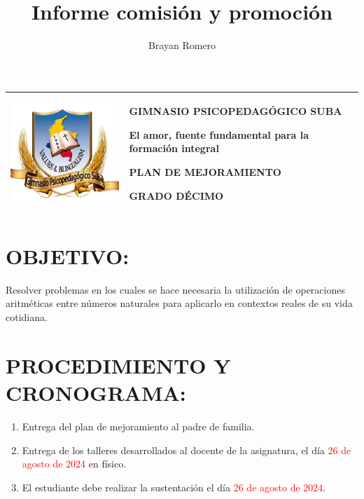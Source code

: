 \documentclass[spanish,12pt,a4paper]{article}
\title{Informe comisión y promoción}
\author{Brayan Romero}
\begin{document}
	
	\begin{center}
		\begin{tabular}{|p{3cm}|p{12cm}|}
			\hline
			\vspace{0.05cm}
			\centering
			\includegraphics[scale=0.35]{logo.png}
			&
			\begin{center}
				\textbf{GIMNASIO PSICOPEDAGÓGICO SUBA}
				
				\vspace{0.1cm}
				El amor, fuente fundamental para la formación integral
				
				\vspace{0.1cm}
				\textbf{PLAN DE MEJORAMIENTO}
				
				\vspace{0.1cm}
				\textbf{GRADO DÉCIMO}
				
			\end{center}
			\\
			\hline
			
			
		\end{tabular}
		
	\end{center}	
	
	\section*{OBJETIVO:}
	Resolver problemas en los cuales se hace necesaria la utilización de operaciones aritméticas entre números naturales para aplicarlo en contextos reales de su vida cotidiana. 
	
	\section*{PROCEDIMIENTO Y CRONOGRAMA:}
	\begin{enumerate}
		\item Entrega del plan de mejoramiento al padre de familia.
		\item Entrega de los talleres desarrollados al docente de la asignatura, el día \textcolor{red}{26 de agosto de 2024} en físico.
		\item El estudiante debe realizar la sustentación el día \textcolor{red}{26 de agosto de 2024}.
	\end{enumerate}
	
\end{document}
